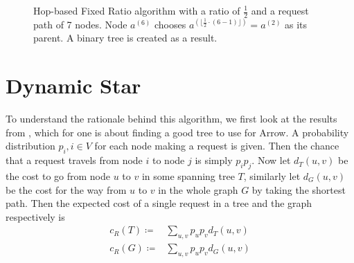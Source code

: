 \documentclass[a4paper, oneside]{discothesis}
\begin{document}
\begin{figure}
\centering
{}
\caption{Hop-based Fixed Ratio algorithm with a ratio of $\frac{1}{2}$ and a request path of 7 nodes. Node $a^{(6)}$ chooses $a^{(\lfloor \frac{1}{2}\cdot(6-1) \rfloor)}=a^{(2)}$ as its parent. A binary tree is created as a result.}
\label{fig:fpr}
\end{figure}

\newpage
\section{Dynamic Star}

To understand the rationale behind this algorithm, we first look at the results from \cite{Peleg}, which for one is about finding a good tree to use for Arrow. A probability distribution $p_i, i\in V$ for each node making a request is given. Then the chance that a request travels from node $i$ to node $j$ is simply $p_ip_j$. Now let $d_T(u,v)$ be the cost to go from node $u$ to $v$ in some spanning tree $T$, similarly let $d_G(u,v)$ be the cost for the way from $u$ to $v$ in the whole graph $G$ by taking the shortest path. Then the expected cost of a single request in a tree and the graph respectively is
\begin{equation}
\begin{split}
c_R(T)\coloneqq & \sum_{u,v}p_up_vd_T(u,v) \\
c_R(G)\coloneqq & \sum_{u,v}p_up_vd_G(u,v) \\
\end{split}
\end{equation}
\end{document}
